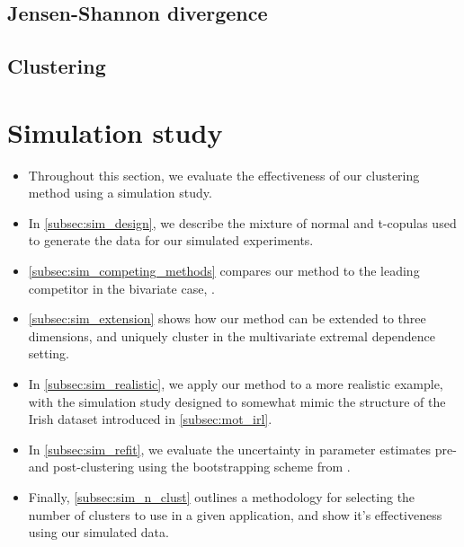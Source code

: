 \documentclass{article}
\numberwithin{equation}{section}
\begin{document}
\subsection{Jensen-Shannon divergence}
\subsection{Clustering}

\section{Simulation study}\label{sec:sim}


\begin{itemize}
  \item Throughout this section, we evaluate the effectiveness of our clustering method using a simulation study.
  \item In \ref{subsec:sim_design}, we describe the mixture of normal and t-copulas used to generate the data for our simulated experiments. 
  \item \ref{subsec:sim_competing_methods} compares our method to the leading competitor in the bivariate case, \cite{Vignotto2021}.
  \item \ref{subsec:sim_extension} shows how our method can be extended to three dimensions, and uniquely cluster in the multivariate extremal dependence setting.
  \item In \ref{subsec:sim_realistic}, we apply our method to a more realistic example, with the simulation study designed to somewhat mimic the structure of the Irish dataset introduced in \ref{subsec:mot_irl}.
  \item In \ref{subsec:sim_refit}, we evaluate the uncertainty in parameter estimates pre- and post-clustering using the bootstrapping scheme from \cite{Heffernan2004}.
  \item Finally, \ref{subsec:sim_n_clust} outlines a methodology for selecting the number of clusters to use in a given application, and show it's effectiveness using our simulated data. 
\end{itemize}
\end{document}
